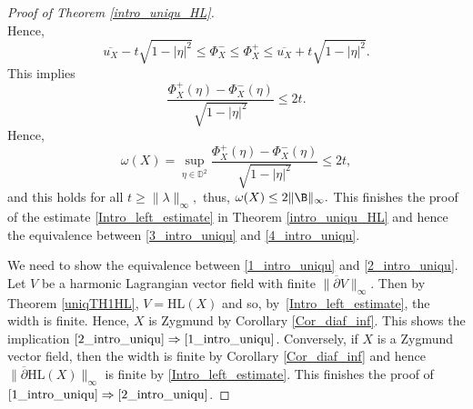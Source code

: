 \begin{proof}[Proof of Theorem \ref{intro_uniqu_HL}]
\[\]
Hence,
\[
\overline{u_X} - t \sqrt{1 - \lvert \eta \rvert^2} \leq \Phi_X^- \leq \Phi_X^+ \leq \overline{u_X} + t \sqrt{1 - \lvert \eta \rvert^2}.
\]
This implies
\[
\frac{\Phi_X^+(\eta) - \Phi_X^-(\eta)}{\sqrt{1 - \lvert \eta \rvert^2}} \leq 2t.
\]
Hence,
\[
\omega(X) = \sup_{\eta \in \mathbb{D}^2} \frac{\Phi_X^+(\eta) - \Phi_X^-(\eta)}{\sqrt{1 - \lvert \eta \rvert^2}} \leq 2t,
\]
and this holds for all \(t \geq \lVert \lambda \rVert_{\infty}, \) thus, \(\omega(X) \leq 2 \lVert \B\rVert_{\infty}. \) This finishes the proof of the estimate \eqref{Intro_left_estimate} in Theorem \ref{intro_uniqu_HL} and hence the equivalence between \eqref{3_intro_uniqu} and \eqref{4_intro_uniqu}.

We need to show the equivalence between \eqref{1_intro_uniqu} and \eqref{2_intro_uniqu}. Let \(V\) be a harmonic Lagrangian vector field with finite \(\lVert \overline{\partial} V \rVert_{\infty}\). Then by Theorem \ref{uniqTH1HL}, \(V = \mathrm{HL}(X)\) and so, by~\eqref{Intro_left_estimate}, the width is finite. Hence, \(X\) is Zygmund by Corollary \ref{Cor_diaf_inf}. This shows the implication $\eqref{2_intro_uniqu} \Rightarrow \eqref{1_intro_uniqu}$. Conversely, if \(X\) is a Zygmund vector field, then the width is finite by Corollary \ref{Cor_diaf_inf} and hence \(\lVert \overline{\partial} \mathrm{HL}(X) \rVert_{\infty}\) is finite by \eqref{Intro_left_estimate}. This finishes the proof of $\eqref{1_intro_uniqu} \Rightarrow\eqref{2_intro_uniqu}$.
\end{proof}

